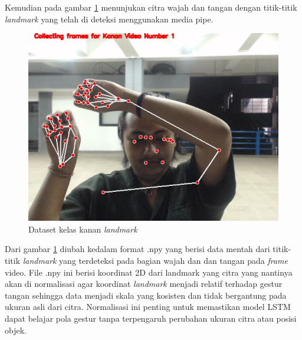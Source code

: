 Kemudian pada gambar \ref{fig:dataset kelas kanan clear} menunjukan citra wajah dan tangan dengan titik-titik \emph{landmark} yang telah di deteksi menggunakan media pipe.
\begin{figure} [H] \centering
  \includegraphics[scale=0.2]{gambar/1.jpg}
  \caption{Dataset kelas kanan \emph{landmark}}
  \label{fig:dataset kelas kanan clear}
\end{figure}
Dari gambar \ref{fig:dataset kelas kanan clear} diubah kedalam format .npy yang berisi data mentah dari titik-titik \emph{landmark}
yang terdeteksi pada bagian wajah dan dan tangan pada \emph{frame} video. File .npy ini berisi koordinat
2D dari landmark yang citra yang nantinya akan di normalisasi agar koordinat \emph{landmark} menjadi relatif 
terhadap gestur tangan sehingga data menjadi skala yang kosisten dan tidak bergantung pada ukuran asli dari citra. 
Normalisasi ini penting untuk memastikan model LSTM dapat belajar pola gestur tanpa terpengaruh perubahan ukuran citra atau posisi objek.
